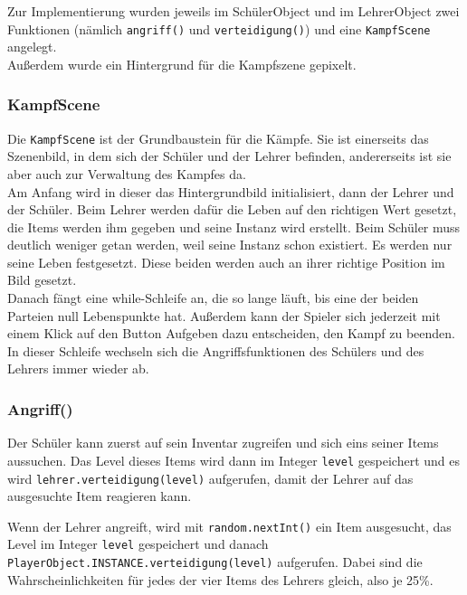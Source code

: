 Zur Implementierung wurden jeweils im SchülerObject und im LehrerObject zwei Funktionen (nämlich \texttt{angriff()} und \texttt{verteidigung()}) und eine \texttt{KampfScene} angelegt.\\
Außerdem wurde ein Hintergrund für die Kampfszene gepixelt.\\

\subsubsection{KampfScene}

Die \texttt{KampfScene} ist der Grundbaustein für die Kämpfe. Sie ist einerseits das Szenenbild, in dem sich der Schüler und der Lehrer befinden, andererseits ist sie aber auch zur Verwaltung des Kampfes da.\\
Am Anfang wird in dieser das Hintergrundbild initialisiert, dann der Lehrer und der Schüler. Beim Lehrer werden dafür die Leben auf den richtigen Wert gesetzt, die Items werden ihm gegeben und seine Instanz wird erstellt. Beim Schüler muss deutlich weniger getan werden, weil seine Instanz schon existiert. Es werden nur seine Leben festgesetzt. Diese beiden werden auch an ihrer richtige Position im Bild gesetzt.\\
Danach fängt eine while-Schleife an, die so lange läuft, bis eine der beiden Parteien null Lebenspunkte hat. Außerdem kann der Spieler sich jederzeit mit einem Klick auf den Button \glqq Aufgeben \grqq dazu entscheiden, den Kampf zu beenden.\\
In dieser Schleife wechseln sich die Angriffsfunktionen des Schülers und des Lehrers immer wieder ab.

\subsubsection{Angriff()}

\begin{sloppypar}
Der Schüler kann zuerst auf sein Inventar zugreifen und sich eins seiner Items aussuchen. Das Level dieses Items wird dann im Integer \texttt{level} gespeichert und es wird \texttt{lehrer.verteidigung(level)} aufgerufen, damit der Lehrer auf das ausgesuchte Item reagieren kann.\par
Wenn der Lehrer angreift, wird mit \texttt{random.nextInt()} ein Item ausgesucht, das Level im Integer \texttt{level} gespeichert und danach \texttt{PlayerObject.INSTANCE.verteidigung(level)} aufgerufen. Dabei sind die Wahrscheinlichkeiten für jedes der vier Items des Lehrers gleich, also je 25\%.
\end{sloppypar}

